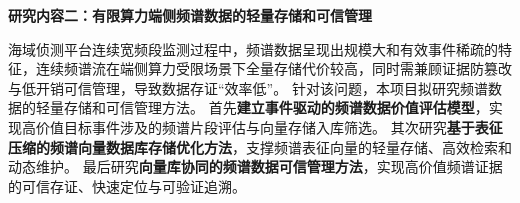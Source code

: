 



\textbf{研究内容二：有限算力端侧频谱数据的轻量存储和可信管理}

海域侦测平台连续宽频段监测过程中，频谱数据呈现出规模大和有效事件稀疏的特征，连续频谱流在端侧算力受限场景下全量存储代价较高，同时需兼顾证据防篡改与低开销可信管理，导致数据存证“效率低”。
针对该问题，本项目拟研究频谱数据的轻量存储和可信管理方法。
首先\textbf{建立事件驱动的频谱数据价值评估模型}，实现高价值目标事件涉及的频谱片段评估与向量存储入库筛选。
其次研究\textbf{基于表征压缩的频谱向量数据库存储优化方法}，支撑频谱表征向量的轻量存储、高效检索和动态维护。
最后研究\textbf{向量库协同的频谱数据可信管理方法}，实现高价值频谱证据的可信存证、快速定位与可验证追溯。

